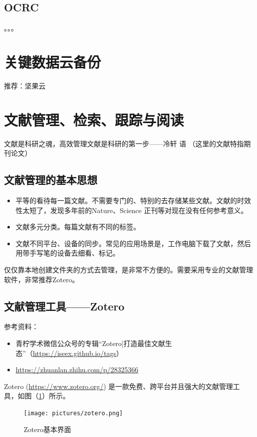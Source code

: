 \subsection{OCRC}
。。。


\section{关键数据云备份}
推荐：坚果云



\section{文献管理、检索、跟踪与阅读}
文献是科研之魂，高效管理文献是科研的第一步——冷轩 \quad 语 （这里的文献特指期刊论文）



\subsection{文献管理的基本思想}
\begin{itemize}
\item 平等的看待每一篇文献。不需要专门的、特别的去存储某些文献。文献的时效性太短了，发现多年前的Nature、Science 正刊等对现在没有任何参考意义。

\item 文献多元分类。每篇文献有不同的标签。

\item 文献不同平台、设备的同步。常见的应用场景是，工作电脑下载了文献，然后用带手写笔的设备去细看、标记。
\end{itemize}
仅仅靠本地创建文件夹的方式去管理，是非常不方便的。需要采用专业的文献管理软件，非常推荐Zotero。





\subsection{文献管理工具——Zotero}
参考资料：
\begin{itemize}
\item 青柠学术微信公众号的专辑“Zotero|打造最佳文献生态”（\url{https://iseex.github.io/tags}）
\item \url{https://zhuanlan.zhihu.com/p/28325366}
\end{itemize}


Zotero (\url{https://www.zotero.org/}) 是一款免费、跨平台并且强大的文献管理工具，如图（\ref{fig566}）所示。
\begin{figure}[h!]
\centering
\texttt{[image: pictures/zotero.png]}
\caption{Zotero基本界面}
\label{fig566}
\end{figure}




